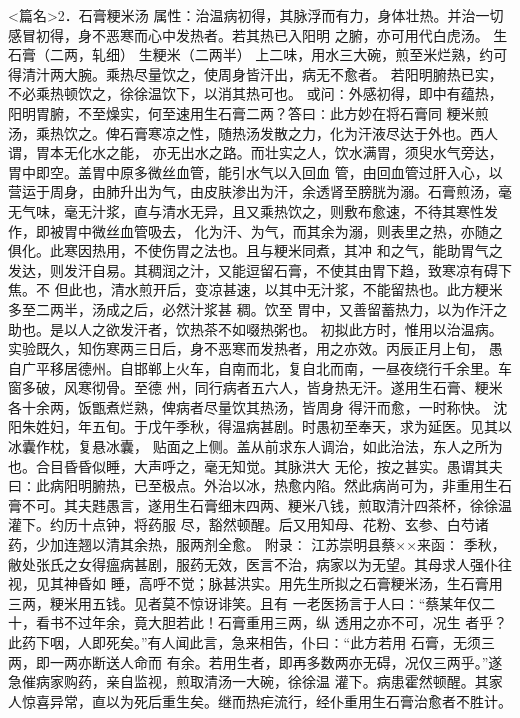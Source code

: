 \documentclass[a4paper,12pt,UTF8,twoside]{ctexbook}
\begin{document}
<篇名>2．石膏粳米汤
属性：治温病初得，其脉浮而有力，身体壮热。并治一切感冒初得，身不恶寒而心中发热者。若其热已入阳明 
之腑，亦可用代白虎汤。 
生石膏（二两，轧细） 生粳米（二两半） 
上二味，用水三大碗，煎至米烂熟，约可得清汁两大腕。乘热尽量饮之，使周身皆汗出，病无不愈者。 
若阳明腑热已实，不必乘热顿饮之，徐徐温饮下，以消其热可也。 
或问∶外感初得，即中有蕴热，阳明胃腑，不至燥实，何至速用生石膏二两？答曰∶此方妙在将石膏同 
粳米煎汤，乘热饮之。俾石膏寒凉之性，随热汤发散之力，化为汗液尽达于外也。西人谓，胃本无化水之能， 
亦无出水之路。而壮实之人，饮水满胃，须臾水气旁达，胃中即空。盖胃中原多微丝血管，能引水气以入回血 
管，由回血管过肝入心，以营运于周身，由肺升出为气，由皮肤渗出为汗，余透肾至膀胱为溺。石膏煎汤，毫 
无气味，毫无汁浆，直与清水无异，且又乘热饮之，则敷布愈速，不待其寒性发作，即被胃中微丝血管吸去， 
化为汗、为气，而其余为溺，则表里之热，亦随之俱化。此寒因热用，不使伤胃之法也。且与粳米同煮，其冲 
和之气，能助胃气之发达，则发汗自易。其稠润之汁，又能逗留石膏，不使其由胃下趋，致寒凉有碍下焦。不 
但此也，清水煎开后，变凉甚速，以其中无汁浆，不能留热也。此方粳米多至二两半，汤成之后，必然汁浆甚 
稠。饮至 
胃中，又善留蓄热力，以为作汗之助也。是以人之欲发汗者，饮热茶不如啜热粥也。 
初拟此方时，惟用以治温病。实验既久，知伤寒两三日后，身不恶寒而发热者，用之亦效。丙辰正月上旬， 
愚自广平移居德州。自邯郸上火车，自南而北，复自北而南，一昼夜绕行千余里。车窗多破，风寒彻骨。至德 
州，同行病者五六人，皆身热无汗。遂用生石膏、粳米各十余两，饭甑煮烂熟，俾病者尽量饮其热汤，皆周身 
得汗而愈，一时称快。 
沈阳朱姓妇，年五旬。于戊午季秋，得温病甚剧。时愚初至奉天，求为延医。见其以冰囊作枕，复悬冰囊， 
贴面之上侧。盖从前求东人调治，如此治法，东人之所为也。合目昏昏似睡，大声呼之，毫无知觉。其脉洪大 
无伦，按之甚实。愚谓其夫曰∶此病阳明腑热，已至极点。外治以冰，热愈内陷。然此病尚可为，非重用生石 
膏不可。其夫韪愚言，遂用生石膏细末四两、粳米八钱，煎取清汁四茶杯，徐徐温灌下。约历十点钟，将药服 
尽，豁然顿醒。后又用知母、花粉、玄参、白芍诸药，少加连翘以清其余热，服两剂全愈。 
附录∶ 
江苏崇明县蔡××来函∶ 
季秋，敝处张氏之女得瘟病甚剧，服药无效，医言不治，病家以为无望。其母求人强仆往视，见其神昏如 
睡，高呼不觉；脉甚洪实。用先生所拟之石膏粳米汤，生石膏用三两，粳米用五钱。见者莫不惊讶诽笑。且有 
一老医扬言于人曰∶“蔡某年仅二十，看书不过年余，竟大胆若此！石膏重用三两，纵 透用之亦不可，况生 
者乎？此药下咽，人即死矣。”有人闻此言，急来相告，仆曰∶“此方若用 石膏，无须三两，即一两亦断送人命而 
有余。若用生者，即再多数两亦无碍，况仅三两乎。”遂急催病家购药，亲自监视，煎取清汤一大碗，徐徐温 
灌下。病患霍然顿醒。其家人惊喜异常，直以为死后重生矣。继而热疟流行，经仆重用生石膏治愈者不胜计。 
\end{document}
